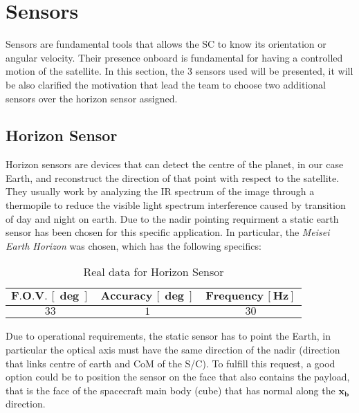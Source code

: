 \section{Sensors}
\label{sec:sensors}

Sensors are fundamental tools that allows the SC to know its orientation or angular velocity. Their presence onboard 
is fundamental for having a controlled motion of the satellite. In this section, the 3 sensors used will be presented, 
it will be also clarified the motivation that lead the team to choose two additional sensors over the horizon sensor 
assigned. 

\subsection{Horizon Sensor}
\label{subsec:horizon_sensor}
Horizon sensors are devices that can detect the centre of the planet, in our case Earth, and reconstruct the direction 
of that point with respect to the satellite. They usually work by analyzing the IR spectrum of the image through a thermopile
to reduce the visible light spectrum interference caused by transition of day and night on earth. 
Due to the nadir pointing requirment a static earth sensor has been chosen for this specific application. In particular, the 
\textit{Meisei Earth Horizon} was chosen, which has the following specifics:

\begin{table}[H]

    \centering
    \begin{tabular}{|c|c|c|}
    \hline
    $\bm{F.O.V. \, [\deg]}$ & $\bm{Accuracy \, [\deg]}$ & $\bm{Frequency \, [Hz]}$ \\
    \hline
    $33$ & $1$ & $30$  \\
    \hline
    \end{tabular}
    
    \caption{Real data for Horizon Sensor}
    \label{table:Hor_sensor}
    
\end{table}

Due to operational requirements, the static sensor has to point the Earth, in particular the optical
axis must have the same direction of the nadir (direction that links centre of earth and CoM of the S/C).
To fulfill this request, a good option could be to position the sensor on the face that also contains the 
payload, that is the face of the spacecraft main body (cube) that has normal along the $\boldsymbol{x_b}$ 
direction. 

